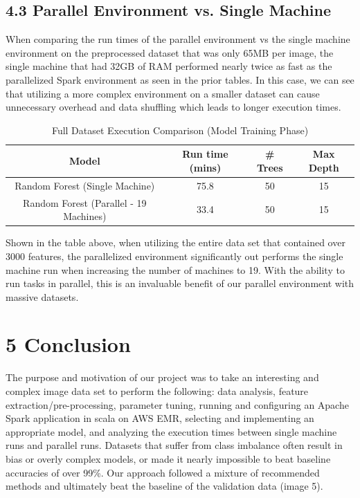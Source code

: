 \documentclass{neu_handout}
\begin{document}
\subsection*{4.3 Parallel Environment vs. Single Machine}

When comparing the run times of the parallel environment vs the single machine environment on the preprocessed dataset that was only 65MB per image, the single machine that had 32GB of RAM performed nearly twice as fast as the parallelized Spark environment as seen in the prior tables. In this case, we can see that utilizing a more complex environment on a smaller dataset can cause unnecessary overhead and data shuffling which leads to longer execution times.

\begin{table}[h!]
\centering
 \begin{tabular}{||c c c c||} 
 \hline
Model & Run time (mins) & \# Trees & Max Depth \\ [0.5ex] 
 \hline\hline
Random Forest (Single Machine) & 75.8  & 50 & 15  \\[1ex] 
 \hline
 Random Forest (Parallel - 19 Machines) & 33.4  & 50 & 15 \\
\hline
 \end{tabular}
 \caption{Full Dataset Execution Comparison (Model Training Phase)}
 \label{tab:accuracy-comparison}
\end{table}

Shown in the table above, when utilizing the entire data set that contained over 3000 features, the parallelized environment significantly out performs the single machine run when increasing the number of machines to 19. With the ability to run tasks in parallel, this is an invaluable benefit of our parallel environment with massive datasets.






\section*{5 Conclusion}
The purpose and motivation of our project was to take an interesting and complex image data set to perform the following: data analysis, feature extraction/pre-processing, parameter tuning, running and configuring an Apache Spark application in scala on AWS EMR, selecting and implementing an appropriate model, and analyzing the execution times between single machine runs and parallel runs. Datasets that suffer from class imbalance often result in bias or overly complex models, or made it nearly impossible to beat baseline accuracies of over 99\%. Our approach followed a mixture of recommended methods and ultimately beat the baseline of the validation data (image 5).\\
\end{document}
